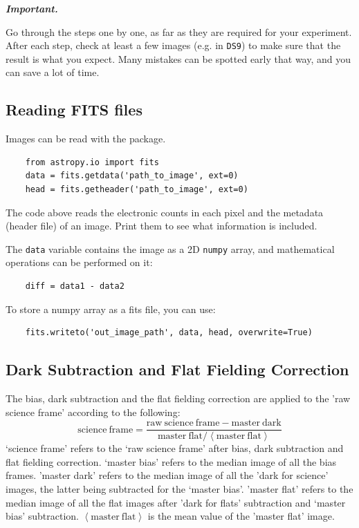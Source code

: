 \documentclass[a4paper, 11pt, fleqn]{memoir}
\newenvironment{important}{
    \begin{propBox}
        \textcolor{oneblue}{\textbf{\textit{Important.}}}
        }{
    \end{propBox}
}
\begin{document}
\begin{important}
    Go through the steps one by one, as far as they are required for your experiment.
    After each step, check at least a few images (e.g. in \texttt{DS9}) to make sure that the result is what you expect.
    Many mistakes can be spotted early that way, and you can save a lot of time.
\end{important}

\subsection{Reading FITS files}

Images can be read with the  package.
\begin{verbatim}
    from astropy.io import fits
    data = fits.getdata('path_to_image', ext=0)
    head = fits.getheader('path_to_image', ext=0)
\end{verbatim}
The code above reads the electronic counts in each pixel and the metadata (header file) of an image.
Print them to see what information is included.

The \texttt{data} variable contains the image as a 2D \texttt{numpy} array, and mathematical operations can be performed on it:
\begin{verbatim}
    diff = data1 - data2
\end{verbatim}

To store a numpy array as a fits file, you can use:
\begin{verbatim}
    fits.writeto('out_image_path', data, head, overwrite=True)
\end{verbatim}

\subsection{Dark Subtraction and Flat Fielding Correction}

The bias, dark subtraction and the flat fielding correction are applied to the 'raw science frame' according to the following:
\begin{equation}
    \mathrm{science\ frame} = \frac{\mathrm{raw\ science\ frame} - \mathrm{master\ dark} }{\mathrm{master\ flat} / \left \langle \mathrm{master\ flat} \right \rangle} \label{correction}
\end{equation}
`science frame' refers to the `raw science frame' after bias, dark subtraction and flat fielding correction.
`master bias' refers to the median image of all the bias frames. 'master dark' refers to the median image of all the 'dark for science' images, the latter being subtracted for the `master bias'. 'master flat' refers to the median image of all the flat images after 'dark for flats' subtraction and `master bias' subtraction. $ \left \langle \mathrm{master\ flat} \right \rangle$ is the mean value of the 'master flat' image.
\end{document}
